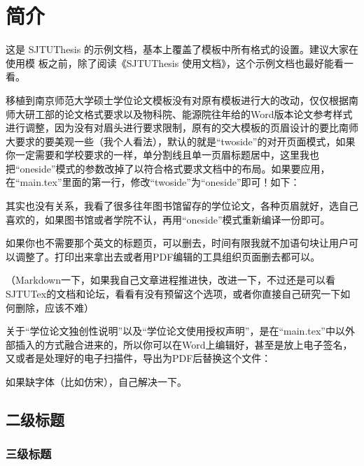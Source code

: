 
\chapter{简介}

这是 SJTUThesis 的示例文档，基本上覆盖了模板中所有格式的设置。建议大家在使用模
板之前，除了阅读《SJTUThesis 使用文档》，这个示例文档也最好能看一看。

移植到南京师范大学硕士学位论文模板没有对原有模板进行大的改动，仅仅根据南师大研工部的论文格式要求以及物科院、能源院往年给的Word版本论文参考样式进行调整，因为没有对眉头进行要求限制，原有的交大模板的页眉设计的要比南师大要求的要美观一些（我个人看法），默认的就是“twoside”的对开页面模式，如果你一定需要和学校要求的一样，单分割线且单一页眉标题居中，这里我也把“oneside”模式的参数改掉了以符合格式要求文档中的布局。如果要应用，在“main.tex”里面的第一行，修改“twoside”为“oneside”即可！如下：


其实也没有关系，我看了很多往年图书馆留存的学位论文，各种页眉就好，选自己喜欢的，如果图书馆或者学院不认，再用“oneside”模式重新编译一份即可。

如果你也不需要那个英文的标题页，可以删去，时间有限我就不加语句块让用户可以调整了。打印出来拿出去或者用PDF编辑的工具组织页面删去都可以。

（Markdown一下，如果我自己文章进程推进快，改进一下，不过还是可以看SJTUTex的文档和论坛，看看有没有预留这个选项，或者你直接自己研究一下如何删除，应该不难）

关于“学位论文独创性说明”以及“学位论文使用授权声明”，是在“main.tex”中以外部插入的方式融合进来的，所以你可以在Word上编辑好，甚至是放上电子签名，又或者是处理好的电子扫描件，导出为PDF后替换这个文件：

\begin{codeblock}[language=tex]
\end{codeblock}

如果缺字体（比如仿宋），自己解决一下。

\section{二级标题}

\subsection{三级标题}

